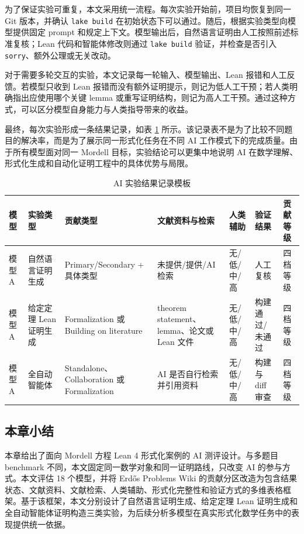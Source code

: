为了保证实验可重复，本文采用统一流程。每次实验开始前，项目均恢复到同一 Git 版本，并确认 \texttt{lake build} 在初始状态下可以通过。随后，根据实验类型向模型提供固定 prompt 和规定上下文。模型输出后，自然语言证明由人工按照前述标准复核；Lean 代码和智能体修改则通过 \texttt{lake build} 验证，并检查是否引入 \texttt{sorry}、额外公理或无关改动。

对于需要多轮交互的实验，本文记录每一轮输入、模型输出、Lean 报错和人工反馈。若模型只收到 Lean 报错而没有额外证明提示，则记为低人工干预；若人类明确指出应使用哪个关键 lemma 或重写证明结构，则记为高人工干预。通过这种方式，可以区分模型自身能力与人类指导带来的收益。

最终，每次实验形成一条结果记录，如表 \ref{tab:ai-result-record} 所示。该记录表不是为了比较不同题目的解决率，而是为了展示同一形式化任务在不同 AI 工作模式下的完成质量。由于所有模型面对同一 Mordell 目标，实验结论可以更集中地说明 AI 在数学理解、形式化生成和自动化证明工程中的具体优势与局限。

\begin{table}[H]
\centering
\scriptsize
\caption{AI 实验结果记录模板}
\label{tab:ai-result-record}
\begin{tabular}{@{}p{}p{}p{}p{}p{}p{}p{}@{}}
\toprule
\textbf{模型} & \textbf{实验类型} & \textbf{贡献类型} & \textbf{文献资料与检索} & \textbf{人类辅助} & \textbf{验证结果} & \textbf{贡献等级} \\
\midrule
模型 A & 自然语言证明生成 & Primary/Secondary + 具体类型 & 未提供/提供/AI 检索 & 无/低/中/高 & 人工复核 & 四档等级 \\
模型 A & 给定定理 Lean 证明生成 & Formalization 或 Building on literature & theorem statement、lemma、论文或 Lean 文件 & 无/低/中/高 & 构建通过/未通过 & 四档等级 \\
模型 A & 全自动智能体 & Standalone、Collaboration 或 Formalization & AI 是否自行检索并引用资料 & 无/低/中/高 & 构建与 diff 审查 & 四档等级 \\
\bottomrule
\end{tabular}
\end{table}

\subsection{本章小结}

本章给出了面向 Mordell 方程 Lean 4 形式化案例的 AI 测评设计。与多题目 benchmark 不同，本文固定同一数学对象和同一证明路线，只改变 AI 的参与方式。本文评估 18 个模型，并将 Erdős Problems Wiki 的贡献分区改造为包含结果状态、文献资料、文献检索、人类辅助、形式化完整性和验证方式的多维表格框架。基于该框架，本文分别设计了自然语言证明生成、给定定理 Lean 证明生成和全自动智能体证明构造三类实验，为后续分析多模型在真实形式化数学任务中的表现提供统一依据。
